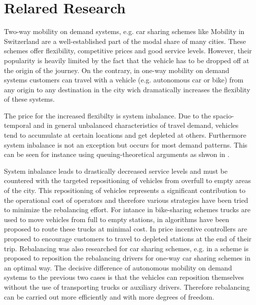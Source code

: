 \section{Relared Research}
\label{subs:literatureResearch}

Two-way mobility on demand systems, e.g. car sharing schemes like Mobility in Switzerland \citep{katzev2003car} are a well-established part of the modal share of many cities. These schemes offer flexibility, competitive prices and good service levels. However, their popularity is heavily limited by the fact that the vehicle has to be dropped off at the origin of the journey. On the contrary, in one-way mobility on demand systems customers can travel with a vehicle (e.g. autonomous car or bike) from any origin to any destination in the city wich dramatically increases the flexiblity of these systems.

The price for the increased flexibilty is system inbalance. Due to the spacio-temporal and in general unbalanced characteristics of travel demand, vehicles tend to accumulate at certain locations and get depleted at others. Furthermore system inbalance is not an exception but occurs for most demand patterns. This can be seen for instance using queuing-theoretical arguments as shwon in \citep{zhang2016control}. 

System inbalance leads to drastically decreased service levels and must be countered with the targeted repositioning of vehicles from overfull to empty areas of the city. This repositioning of vehicles represents a significant contribution to the operational cost of operators and therefore various strategies have been tried to minimize the rebalancing effort. For intance in bike-sharing schemes trucks are used to move vehicles from full to empty stations, in \citep{pfrommer2014dynamic} algorithms have been proposed to route these trucks at minimal cost. In \citep{ruch2014rule} price incentive controllers are proposed to encourage customers to travel to depleted stations at the end of their trip. Rebalancing was also researched for car sharing schemes, e.g. in \citep{smith2013rebalancing} a scheme is proposed to reposition the rebalancing drivers for one-way car sharing schemes in an optimal way. The decisive difference of autonomous mobility on demand systems to the previous two cases is that the vehicles can reposition themselves without the use of transporting trucks or auxiliary drivers. Therefore rebalancing can be carried out more efficiently and with more degrees of freedom. 

